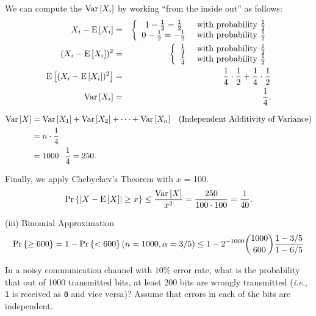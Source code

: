 \documentclass[11pt,twoside]{article}
\begin{document}
\begin{problem}
\begin{problemparts}
{We can compute the $\mathop{\textup{Var}}\nolimits\left[X_i\right]$ by working ``from the inside out'' as
follows:
\begin{eqnarray*}
X_i - \mathop{\textup{E}}\nolimits\left[X_i\right]
        & = &   \left\{
                \begin{array}{cl}
                     1 - \frac{1}{2} = \frac{1}{2} & \text{ with probability } \frac{1}{2} \\
                     0 - \frac{1}{2} = -\frac{1}{2} & \text{ with probability } \frac{1}{2}
                \end{array}
                \right. \\
(X_i - \mathop{\textup{E}}\nolimits\left[X_i\right])^2
        & = &   \left\{
                \begin{array}{cl}
                        \frac{1}{4} & \text{ with probability } \frac{1}{2} \\
                        \frac{1}{4} & \text{ with probability } \frac{1}{2}
                \end{array}
                \right. \\
\mathop{\textup{E}}\nolimits\left[(X_i - \mathop{\textup{E}}\nolimits\left[X_i\right])^2\right]
        & = &   \frac{1}{4} \cdot \frac{1}{2} + \frac{1}{4} \cdot \frac{1}{2} \\
\mathop{\textup{Var}}\nolimits\left[X_i\right] & = & \frac{1}{4}.
\end{eqnarray*}

\begin{align*}
\mathop{\textup{Var}}\nolimits\left[X\right]
   & =  \mathop{\textup{Var}}\nolimits\left[X_1\right] + \mathop{\textup{Var}}\nolimits\left[X_2\right] + \cdots + \mathop{\textup{Var}}\nolimits\left[X_n\right]
              & \text{(Independent Additivity of Variance)}\\
   & =  n \cdot \frac{1}{4}\\
   & = 1000 \cdot \frac{1}{4} = 250.
\end{align*}

Finally, we apply Chebychev's Theorem with $x$ = 100. 
\[
\mathop{\textup{Pr}}\nolimits\left\{\left|X - \mathop{\textup{E}}\nolimits\left[X\right]\right| \geq x\right\} \leq \frac{\mathop{\textup{Var}}\nolimits\left[X\right]}{x^2} = \frac{250}{100 \cdot 100} = \frac{1}{40}.
\]

\iffalse

But since the probability of the distribution is symmetric:

\[
\pr{X- \expect{X} \geq 100} = \frac{\pr{\abs{X - \expect{X}} \geq 100}}{2}
& = \frac{1}{40} \cdot \frac{1}{2}
& = \frac{1}{80}
\]
\fi


(iii) Binomial Approximation
\[
\mathop{\textup{Pr}}\nolimits\left\{\geq 600\right\} = 1-\mathop{\textup{Pr}}\nolimits\left\{< 600\right\}(n=1000,\alpha=3/5)\leq 1 -
2^{-1000}{\binom{1000}{600}}{\frac{1-3/5}{1-6/5}}
\]
}


\problempart
In a noisy communication channel with $10\%$ error rate, what is the
probability that out of 1000 transmitted bits, at least 200 bits are 
wrongly transmitted ({\em i.e.}, {\tt 1} is received as {\tt 0} and 
vice versa)? Assume that errors in each of the bits are independent.


\end{problemparts}
\end{problem}
\end{document}
